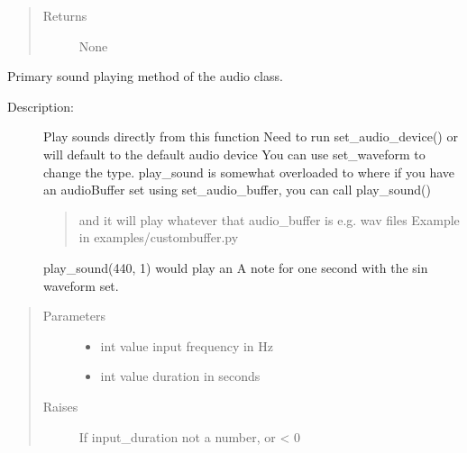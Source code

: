 \documentclass[letterpaper,10pt,english,openany,oneside]{sphinxmanual}
\begin{document}
\begin{fulllineitems}
\begin{fulllineitems}
\begin{quote}
\begin{description}
\item[{Returns}] \leavevmode
\sphinxAtStartPar
None

\end{description}\end{quote}

\end{fulllineitems}



\begin{fulllineitems}
\sphinxAtStartPar
Primary sound playing method of the audio class.
\begin{description}
\item[{Description:}] \leavevmode
\sphinxAtStartPar
Play sounds directly from this function
Need to run set\_audio\_device() or will default to the default audio device
You can use set\_waveform to change the type.
play\_sound is somewhat overloaded to where if you have an audioBuffer set using set\_audio\_buffer, you can call play\_sound()
\begin{quote}

\sphinxAtStartPar
and it will play whatever that audio\_buffer is e.g. wav files
Example in examples/custombuffer.py
\end{quote}

\sphinxAtStartPar
play\_sound(440, 1) would play an A note for one second with the sin waveform set.

\end{description}
\begin{quote}\begin{description}
\item[{Parameters}] \leavevmode\begin{itemize}
\item {} 
\sphinxAtStartPar
{} \textendash{} int value \sphinxhyphen{} input frequency in Hz

\item {} 
\sphinxAtStartPar
{} \textendash{} int value \sphinxhyphen{} duration in seconds

\end{itemize}

\item[{Raises}] \leavevmode
\sphinxAtStartPar
{} \textendash{} If input\_duration not a number, or \textless{} 0


\end{description}
\end{quote}
\end{fulllineitems}
\end{fulllineitems}
\end{document}
